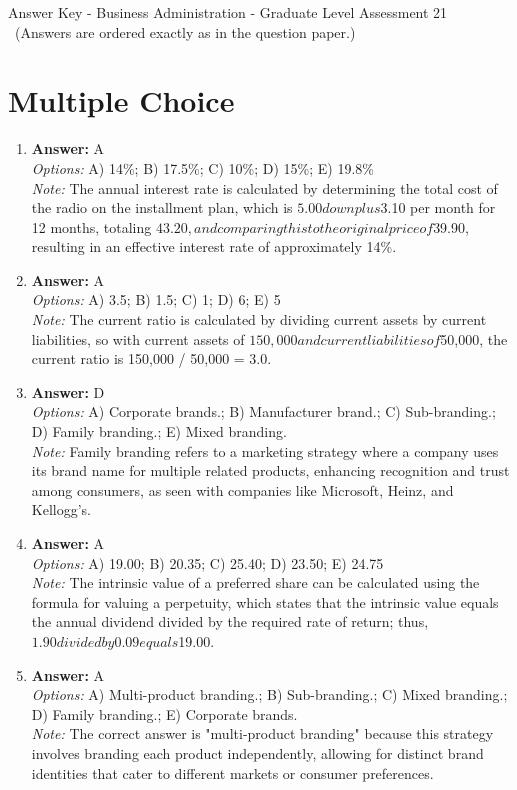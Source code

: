 \documentclass[12pt]{article}
\begin{document}
\begin{center}
Answer Key - Business Administration - Graduate Level Assessment 21 \
\small (Answers are ordered exactly as in the question paper.)
\end{center}

\section*{Multiple Choice}
\begin{enumerate}[label=\arabic*.]
\item \textbf{Answer:} A
\\ \textit{Options:} A) 14\%; B) 17.5\%; C) 10\%; D) 15\%; E) 19.8\%
\\ \textit{Note:} The annual interest rate is calculated by determining the total cost of the radio on the installment plan, which is $5.00 down plus $3.10 per month for 12 months, totaling $43.20, and comparing this to the original price of $39.90, resulting in an effective interest rate of approximately 14\%.
\item \textbf{Answer:} A
\\ \textit{Options:} A) 3.5; B) 1.5; C) 1; D) 6; E) 5
\\ \textit{Note:} The current ratio is calculated by dividing current assets by current liabilities, so with current assets of $150,000 and current liabilities of $50,000, the current ratio is 150,000 / 50,000 = 3.0.
\item \textbf{Answer:} D
\\ \textit{Options:} A) Corporate brands.; B) Manufacturer brand.; C) Sub-branding.; D) Family branding.; E) Mixed branding.
\\ \textit{Note:} Family branding refers to a marketing strategy where a company uses its brand name for multiple related products, enhancing recognition and trust among consumers, as seen with companies like Microsoft, Heinz, and Kellogg's.
\item \textbf{Answer:} A
\\ \textit{Options:} A) 19.00; B) 20.35; C) 25.40; D) 23.50; E) 24.75
\\ \textit{Note:} The intrinsic value of a preferred share can be calculated using the formula for valuing a perpetuity, which states that the intrinsic value equals the annual dividend divided by the required rate of return; thus, $1.90 divided by 0.09 equals $19.00.
\item \textbf{Answer:} A
\\ \textit{Options:} A) Multi-product branding.; B) Sub-branding.; C) Mixed branding.; D) Family branding.; E) Corporate brands.
\\ \textit{Note:} The correct answer is "multi-product branding" because this strategy involves branding each product independently, allowing for distinct brand identities that cater to different markets or consumer preferences.
\end{enumerate}
\end{document}

